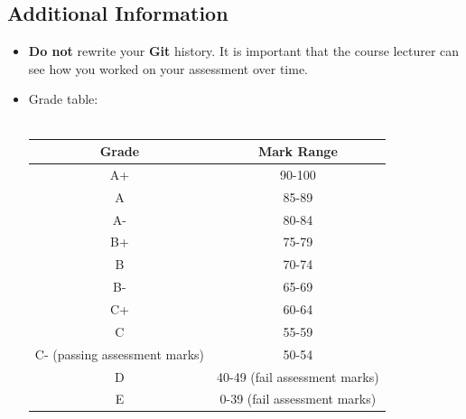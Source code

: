 \documentclass{article}
\begin{document}
\subsection*{Additional Information}
\begin{itemize}
	\item \textbf{Do not} rewrite your \textbf{Git} history. It is important that the course lecturer can see how you worked on your assessment over time.
    \item Grade table:\\\\
    \renewcommand{\arraystretch}{1.5}
    \begin{tabular}{|c|c|}
        \hline
        \textbf{Grade} & \textbf{Mark Range} \\ \hline
        A+ & 90-100  \\ \hline
        A & 85-89  \\ \hline
        A- & 80-84 \\ \hline
        B+ & 75-79   \\ \hline
        B & 70-74  \\ \hline
        B- & 65-69  \\ \hline
        C+ & 60-64  \\ \hline
        C & 55-59 \\ \hline
        C- (passing assessment marks) & 50-54  \\ \hline
        D & 40-49 (fail assessment marks)   \\ \hline
        E & 0-39 (fail assessment marks)   \\ \hline
    \end{tabular}
\end{itemize}
\end{document}
